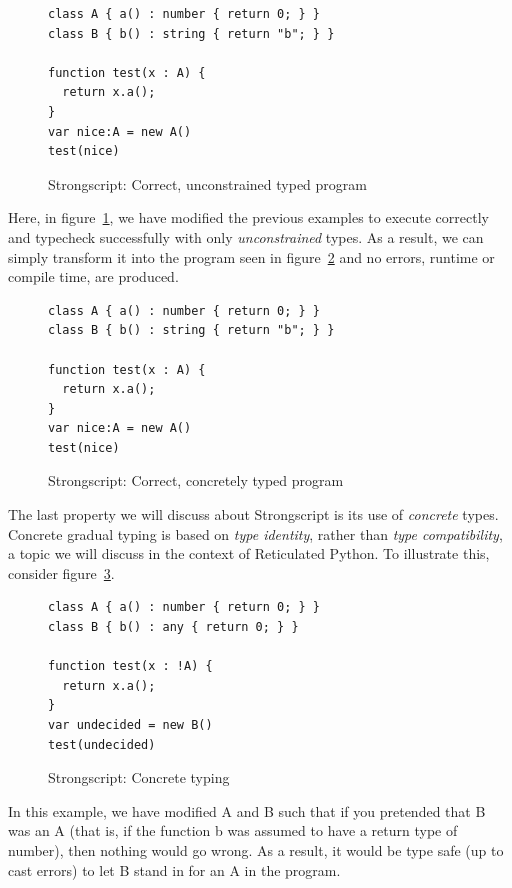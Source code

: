 \documentclass[a4paper,USenglish]{tex/lipics-v2016}
\begin{document}
\begin{figure}[h]
\begin{verbatim}
class A { a() : number { return 0; } }
class B { b() : string { return "b"; } }

function test(x : A) {
  return x.a();
}
var nice:A = new A()
test(nice)
\end{verbatim}
\caption{Strongscript: Correct, unconstrained typed program}
\label{fig:ssex2}
\end{figure}

Here, in figure~\ref{fig:ssex2}, we have modified the previous examples to execute correctly and typecheck
successfully with only \emph{unconstrained} types. As a result, we can simply 
transform it into the program seen in figure~\ref{fig:ssex3} and no errors, runtime
or compile time, are produced.

\begin{figure}[h]
\begin{verbatim}
class A { a() : number { return 0; } }
class B { b() : string { return "b"; } }

function test(x : A) {
  return x.a();
}
var nice:A = new A()
test(nice)
\end{verbatim}
\caption{Strongscript: Correct, concretely typed program}
\label{fig:ssex3}
\end{figure}

The last property we will discuss about Strongscript is its use of 
\emph{concrete} types. Concrete gradual typing is based on \emph{type identity},
rather than \emph{type compatibility}, a topic we will discuss in the context of
Reticulated Python. To illustrate this, consider figure~\ref{fig:ssex4}.

\begin{figure}[h]
\begin{verbatim}
class A { a() : number { return 0; } }
class B { b() : any { return 0; } }

function test(x : !A) {
  return x.a();
}
var undecided = new B()
test(undecided)
\end{verbatim}
\caption{Strongscript: Concrete typing}
\label{fig:ssex4}
\end{figure}

In this example, we have modified A and B such that if you pretended that B
was an A (that is, if the function b was assumed to have a return type
of number), then nothing would go wrong. As a result, it would be type
safe (up to cast errors) to let B stand in for an A in the program.
\end{document}
